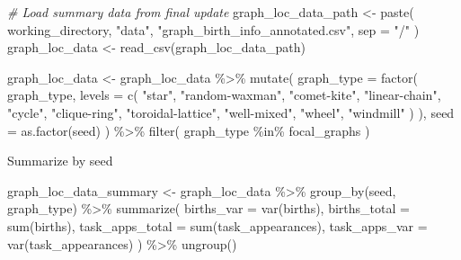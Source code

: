 \documentclass[
]{book}
\newenvironment{Shaded}{\begin{snugshade}}{\end{snugshade}}
\newcommand{\AttributeTok}[1]{\textcolor[rgb]{0.77,0.63,0.00}{#1}}
\newcommand{\CommentTok}[1]{\textcolor[rgb]{0.56,0.35,0.01}{\textit{#1}}}
\newcommand{\FunctionTok}[1]{\textcolor[rgb]{0.00,0.00,0.00}{#1}}
\newcommand{\NormalTok}[1]{#1}
\newcommand{\OtherTok}[1]{\textcolor[rgb]{0.56,0.35,0.01}{#1}}
\newcommand{\SpecialCharTok}[1]{\textcolor[rgb]{0.00,0.00,0.00}{#1}}
\newcommand{\StringTok}[1]{\textcolor[rgb]{0.31,0.60,0.02}{#1}}
\begin{document}
\begin{Shaded}
\begin{Highlighting}[]
\CommentTok{\# Load summary data from final update}
\NormalTok{graph\_loc\_data\_path }\OtherTok{\textless{}{-}} \FunctionTok{paste}\NormalTok{(}
\NormalTok{  working\_directory,}
  \StringTok{"data"}\NormalTok{,}
  \StringTok{"graph\_birth\_info\_annotated.csv"}\NormalTok{,}
  \AttributeTok{sep =} \StringTok{"/"}
\NormalTok{)}
\NormalTok{graph\_loc\_data }\OtherTok{\textless{}{-}} \FunctionTok{read\_csv}\NormalTok{(graph\_loc\_data\_path)}

\NormalTok{graph\_loc\_data }\OtherTok{\textless{}{-}}\NormalTok{ graph\_loc\_data }\SpecialCharTok{\%\textgreater{}\%}
  \FunctionTok{mutate}\NormalTok{(}
    \AttributeTok{graph\_type =} \FunctionTok{factor}\NormalTok{(}
\NormalTok{      graph\_type,}
      \AttributeTok{levels =} \FunctionTok{c}\NormalTok{(}
        \StringTok{"star"}\NormalTok{,}
        \StringTok{"random{-}waxman"}\NormalTok{,}
        \StringTok{"comet{-}kite"}\NormalTok{,}
        \StringTok{"linear{-}chain"}\NormalTok{,}
        \StringTok{"cycle"}\NormalTok{,}
        \StringTok{"clique{-}ring"}\NormalTok{,}
        \StringTok{"toroidal{-}lattice"}\NormalTok{,}
        \StringTok{"well{-}mixed"}\NormalTok{,}
        \StringTok{"wheel"}\NormalTok{,}
        \StringTok{"windmill"}
\NormalTok{      )}
\NormalTok{    ),}
    \AttributeTok{seed =} \FunctionTok{as.factor}\NormalTok{(seed)}
\NormalTok{  ) }\SpecialCharTok{\%\textgreater{}\%}
  \FunctionTok{filter}\NormalTok{(}
\NormalTok{    graph\_type }\SpecialCharTok{\%in\%}\NormalTok{ focal\_graphs}
\NormalTok{  )}
\end{Highlighting}
\end{Shaded}

Summarize by seed

\begin{Shaded}
\begin{Highlighting}[]
\NormalTok{graph\_loc\_data\_summary }\OtherTok{\textless{}{-}}\NormalTok{ graph\_loc\_data }\SpecialCharTok{\%\textgreater{}\%}
  \FunctionTok{group\_by}\NormalTok{(seed, graph\_type) }\SpecialCharTok{\%\textgreater{}\%}
  \FunctionTok{summarize}\NormalTok{(}
    \AttributeTok{births\_var =} \FunctionTok{var}\NormalTok{(births),}
    \AttributeTok{births\_total =} \FunctionTok{sum}\NormalTok{(births),}
    \AttributeTok{task\_apps\_total =} \FunctionTok{sum}\NormalTok{(task\_appearances),}
    \AttributeTok{task\_apps\_var =} \FunctionTok{var}\NormalTok{(task\_appearances)}
\NormalTok{  ) }\SpecialCharTok{\%\textgreater{}\%}
  \FunctionTok{ungroup}\NormalTok{()}
\end{Highlighting}
\end{Shaded}
\end{document}
